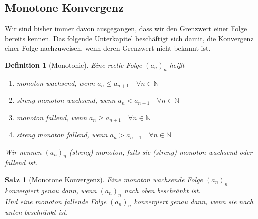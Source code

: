\documentclass[11pt, twoside, a4paper]{article}
\theoremstyle{plain}
\newtheorem{definition}[blockelement]{Definition}
\newtheorem{satz}[blockelement]{Satz}
\newcommand{\naturalnumbers}{\mathbb{N}}
\begin{document}
    \subsection{Monotone Konvergenz}

    Wir sind bisher immer davon ausgegangen, dass wir den Grenzwert einer Folge bereits kennen. Das folgende Unterkapitel beschäftigt sich damit, die Konvergenz einer Folge nachzuweisen, wenn deren Grenzwert nicht bekannt ist.

    \begin{definition}[Monotonie]
        Eine reelle Folge $(a_n)_n$ heißt
        \begin{enumerate}[label=(\roman*)]
            \item monoton wachsend, wenn $a_n \leq a_{n+1}\quad\forall n\in\naturalnumbers$
            \item streng monoton wachsend, wenn $a_n < a_{n+1}\quad\forall n\in\naturalnumbers$
            \item monoton fallend, wenn $a_n \geq a_{n+1}\quad\forall n\in\naturalnumbers$
            \item streng monoton fallend, wenn $a_n > a_{n+1}\quad\forall n\in\naturalnumbers$
        \end{enumerate}
        \noindent Wir nennen $(a_n)_n$ (streng) monoton, falls sie (streng) monoton wachsend oder fallend ist.
    \end{definition}

    \begin{satz}[Monotone Konvergenz]
        \label{satz:monoton-konv}
        Eine monoton wachsende Folge $(a_n)_n$ konvergiert genau dann, wenn $(a_n)_n$ nach oben beschränkt ist.\\
        Und eine monoton fallende Folge $(a_n)_n$ konvergiert genau dann, wenn sie nach unten beschränkt ist.
    \end{satz}
\end{document}
